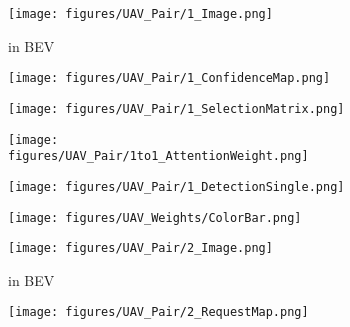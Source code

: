 \documentclass{article}
\begin{document}
\begin{figure}[!t]

  \centering
\begin{subfigure}{0.18\linewidth}
    \texttt{[image: figures/UAV\_Pair/1\_Image.png]}
    \vspace{-5mm}
    \caption{ in BEV}
    \label{fig:UAV_BEVImage1}
  \end{subfigure}
\begin{subfigure}{0.18\linewidth}
    \texttt{[image: figures/UAV\_Pair/1\_ConfidenceMap.png]}
    \vspace{-5mm}
    \caption{}
    \label{fig:UAV_ConfMap1}
  \end{subfigure}
  \begin{subfigure}{0.18\linewidth}
    \texttt{[image: figures/UAV\_Pair/1\_SelectionMatrix.png]}
    \vspace{-5mm}
    \caption{}
    \label{fig:UAV_SelectMat1}
  \end{subfigure}
  \begin{subfigure}{0.18\linewidth}
    \texttt{[image: figures/UAV\_Pair/1to1\_AttentionWeight.png]}
    \vspace{-5mm}
    \caption{}
    \label{fig:UAV_AttenWeight1to1}
  \end{subfigure}
\begin{subfigure}{0.18\linewidth}
    \texttt{[image: figures/UAV\_Pair/1\_DetectionSingle.png]}
    \vspace{-5mm}
    \caption{}
    \label{fig:UAV_DetectionBeforeComm}
  \end{subfigure}
  \begin{subfigure}{0.04\linewidth}
    \texttt{[image: figures/UAV\_Weights/ColorBar.png]}
\end{subfigure}
  \centering
  \begin{subfigure}{0.18\linewidth}
    \texttt{[image: figures/UAV\_Pair/2\_Image.png]}
    \vspace{-5mm}
    \caption{ in BEV}
    \label{fig:UAV_BEVImage2}
  \end{subfigure}
\begin{subfigure}{0.18\linewidth}
    \texttt{[image: figures/UAV\_Pair/2\_RequestMap.png]}
    \vspace{-5mm}
    \caption{}
    \label{fig:UAV_RequestMap2}
  \end{subfigure}
  \begin{subfigure}{0.18\linewidth}

\end{subfigure}
\end{figure}
\end{document}
